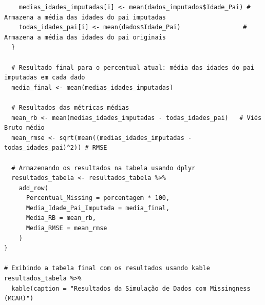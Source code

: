 \documentclass[11pt]{article}
\begin{document}
\begin{verbatim}
    medias_idades_imputadas[i] <- mean(dados_imputados$Idade_Pai) # Armazena a média das idades do pai imputadas
    todas_idades_pai[i] <- mean(dados$Idade_Pai)                 # Armazena a média das idades do pai originais
  }
  
  # Resultado final para o percentual atual: média das idades do pai imputadas em cada dado
  media_final <- mean(medias_idades_imputadas)
  
  # Resultados das métricas médias
  mean_rb <- mean(medias_idades_imputadas - todas_idades_pai)   # Viés Bruto médio
  mean_rmse <- sqrt(mean((medias_idades_imputadas - todas_idades_pai)^2)) # RMSE

  # Armazenando os resultados na tabela usando dplyr
  resultados_tabela <- resultados_tabela %>%
    add_row(
      Percentual_Missing = porcentagem * 100,
      Media_Idade_Pai_Imputada = media_final,
      Media_RB = mean_rb,
      Media_RMSE = mean_rmse
    )
}

# Exibindo a tabela final com os resultados usando kable
resultados_tabela %>%
  kable(caption = "Resultados da Simulação de Dados com Missingness (MCAR)")

\end{verbatim}
\end{document}

